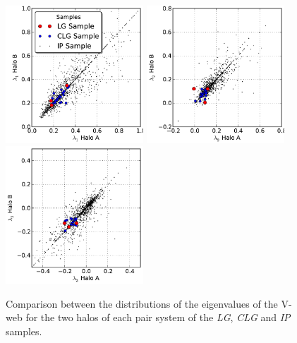 \
\begin{figure}[htbp]
	\centering
	\includegraphics[width=0.46\textwidth]
	{./figures/4_results/CLG_L11_L12.pdf}
	\includegraphics[width=0.46\textwidth]
	{./figures/4_results/CLG_L21_L22.pdf}
	\includegraphics[width=0.46\textwidth]
	{./figures/4_results/CLG_L31_L32.pdf}

	\caption{\small{Comparison between the distributions of the 
	eigenvalues	of the V-web for the two halos of each pair system of
	the \textit{LG}, \textit{CLG} and \textit{IP} samples.}}
	\label{fig:Lambda_Comparison_Pairs}
\end{figure}


